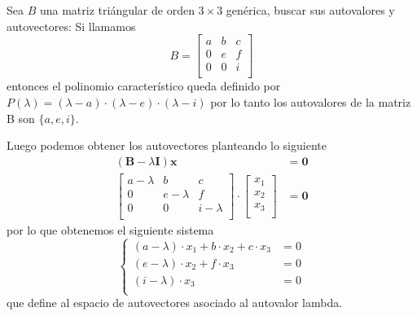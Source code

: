 \begin{example}[]
    Sea $B$ una matriz triángular de orden $3\times 3$ genérica, buscar sus
    autovalores y autovectores:
    \vspace*{5pt}
    Si llamamos
    \begin{equation*}
        B = 
        \begin{bmatrix}
        a & b & c\\
        0 & e & f\\
        0 & 0 & i\\
        \end{bmatrix}
    \end{equation*}
    entonces el polinomio característico queda definido por 
    $P(\lambda) = (\lambda - a)\cdot (\lambda - e) \cdot (\lambda - i)$ por lo tanto
    los autovalores de la matriz B son $\{a, e, i\}$.

    Luego podemos obtener los autovectores planteando lo siguiente
    \begin{equation*}
        \begin{split}
            (\bm{B} - \lambda \bm{I}) \bm{x} &= \bm{0} \\
            \begin{bmatrix}
            a-\lambda & b & c\\
            0 & e-\lambda & f\\
            0 & 0 & i-\lambda\\
            \end{bmatrix} \cdot
            \begin{bmatrix}
            x_1\\
            x_2\\
            x_3\\
            \end{bmatrix} &= \bm{0}
        \end{split}
    \end{equation*}
    por lo que obtenemos el siguiente sistema
    \begin{equation}
        \begin{cases}
            (a-\lambda)\cdot x_1 + b\cdot x_2 + c \cdot x_3 &= 0\\
            (e-\lambda)\cdot x_2 + f \cdot x_3 &= 0\\
            (i-\lambda)\cdot x_3 &=0 \\
        \end{cases}
    \end{equation}
    que define al espacio de autovectores asociado al autovalor lambda.

\end{example}
